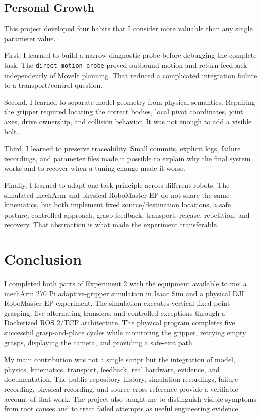 \documentclass[UTF8,zihao=-4,scheme=chinese,fontset=none]{ctexart}
\begin{document}
\subsection{Personal Growth}

This project developed four habits that I consider more valuable than any single parameter value.

First, I learned to build a narrow diagnostic probe before debugging the complete task. The \texttt{direct\_motion\_probe} proved outbound motion and return feedback independently of MoveIt planning. That reduced a complicated integration failure to a transport/control question.

Second, I learned to separate model geometry from physical semantics. Repairing the gripper required locating the correct bodies, local pivot coordinates, joint axes, drive ownership, and collision behavior. It was not enough to add a visible bolt.

Third, I learned to preserve traceability. Small commits, explicit logs, failure recordings, and parameter files made it possible to explain why the final system works and to recover when a tuning change made it worse.

Finally, I learned to adapt one task principle across different robots. The simulated mechArm and physical RoboMaster EP do not share the same kinematics, but both implement fixed source/destination locations, a safe posture, controlled approach, grasp feedback, transport, release, repetition, and recovery. That abstraction is what made the experiment transferable.

\section{Conclusion}

I completed both parts of Experiment 2 with the equipment available to me: a mechArm 270 Pi adaptive-gripper simulation in Isaac Sim and a physical DJI RoboMaster EP experiment. The simulation executes vertical fixed-point grasping, five alternating transfers, and controlled exceptions through a Dockerized ROS 2/TCP architecture. The physical program completes five successful grasp-and-place cycles while monitoring the gripper, retrying empty grasps, displaying the camera, and providing a safe-exit path.

My main contribution was not a single script but the integration of model, physics, kinematics, transport, feedback, real hardware, evidence, and documentation. The public repository history, simulation recordings, failure recording, physical recording, and source cross-reference provide a verifiable account of that work. The project also taught me to distinguish visible symptoms from root causes and to treat failed attempts as useful engineering evidence.
\end{document}
